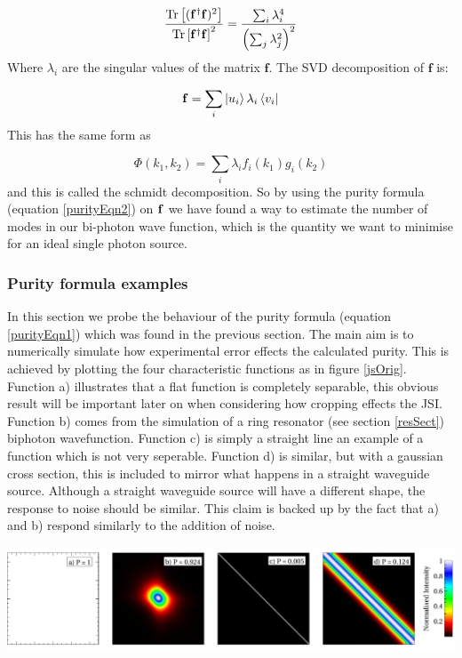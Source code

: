 \begin{align}
\frac{\operatorname{Tr}\left [({\bf f}^{\dagger}{\bf f})^2 \right ]}{\operatorname{Tr}\left [{\bf f}^{\dagger}{\bf f} \right ]^2}=\frac{\sum_{i}\lambda^4_i}{\left ( \sum_{j}\lambda^2_j \right )^2}
\end{align}
\noindent
Where $\lambda_i$ are the singular values of the matrix $\mathbf{f}$. The SVD decomposition of $\mathbf{f}$ is:

\begin{equation}
 {\bf f} = \sum_i \ket{u_i} \lambda_i \bra{v_i}
\end{equation}
\noindent
This has the same form as

\begin{equation} \label{modes2}
	\Phi(k_1,k_2) = \sum_i \lambda_if_i(k_1)g_i(k_2)
\end{equation}
\noindent
and this is called the schmidt decomposition. So by using the purity formula (equation \ref{purityEqn2}) on ${\bf f }$ we have found a way to estimate the number of modes in our bi-photon wave function, which is the quantity we want to minimise for an ideal single photon source.

\subsubsection{Purity formula examples}

In this section we probe the behaviour of the purity formula (equation \ref{purityEqn1}) which was found in the previous section. The main aim is to numerically simulate how experimental error effects the calculated purity. This is achieved by plotting the four characteristic functions as in figure \ref{jsOrig}. Function a) illustrates that a flat function is completely separable, this obvious result will be important later on when considering how cropping effects the JSI. Function b) comes from the simulation of a ring resonator (see section \ref{resSect}) biphoton wavefunction. Function c) is simply a straight line an example of a function which is not very seperable. Function d) is similar, but with a gaussian cross section, this is included to mirror what happens in a straight waveguide source. Although a straight waveguide source will have a different shape, the response to noise should be similar. This claim is backed up by the fact that a) and b) respond similarly to the addition of noise.

\begingroup
\centering
    \includegraphics[width=17cm]{res/theory/js_original.pdf}
\label{jsOrig}
\endgroup

